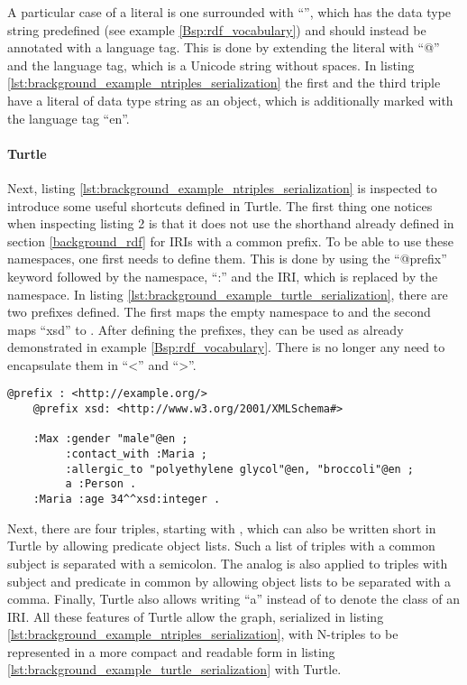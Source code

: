     A particular case of a literal is one surrounded with ``'', which has the data type string predefined (see example \ref{Bsp:rdf_vocabulary}) and should instead be annotated with a language tag. This is done by extending the literal with ``@'' and the language tag, which is a Unicode string without spaces. In listing \ref{lst:brackground_example_ntriples_serialization} the first and the third triple have a literal of data type string as an object, which is additionally marked with the language tag ``en''. 
    
    \paragraph{Turtle} Next, listing \ref{lst:brackground_example_ntriples_serialization} is inspected to introduce some useful shortcuts defined in Turtle.
    The first thing one notices when inspecting listing 2 is that it does not use the shorthand already defined in section \ref{background_rdf} for IRIs with a common prefix. To be able to use these namespaces, one first needs to define them. This is done by using the ``@prefix'' keyword followed by the namespace, ``:'' and the IRI, which is replaced by the namespace. 
    In listing \ref{lst:brackground_example_turtle_serialization}, there are two prefixes defined. The first maps the empty namespace to  and the second maps ``xsd'' to .
    After defining the prefixes, they can be used as already demonstrated in example \ref{Bsp:rdf_vocabulary}. There is no longer any need to encapsulate them in ``<'' and ``>''.
    \lstset{language=html}
    \begin{lstlisting}[float,captionpos=b, caption=A Turtle serialization of the graph serialized with N-Triples in listing \ref{lst:brackground_example_ntriples_serialization}, label=lst:brackground_example_turtle_serialization, basicstyle=\ttfamily, frame=single]
    @prefix : <http://example.org/>
    @prefix xsd: <http://www.w3.org/2001/XMLSchema#>

    :Max :gender "male"@en ;
         :contact_with :Maria ;
         :allergic_to "polyethylene glycol"@en, "broccoli"@en ;
         a :Person .
    :Maria :age 34^^xsd:integer .
    \end{lstlisting}
    Next, there are four triples, starting with , which can also be written short in Turtle by allowing predicate object lists. Such a list of triples with a common subject is separated with a semicolon. The analog is also applied to triples with subject and predicate in common by allowing object lists to be separated with a comma. Finally, Turtle also allows writing ``a'' instead of  to denote the class of an IRI. All these features of Turtle allow the graph, serialized in listing \ref{lst:brackground_example_ntriples_serialization}, with N-triples to be represented in a more compact and readable form in listing \ref{lst:brackground_example_turtle_serialization} with Turtle.
    
